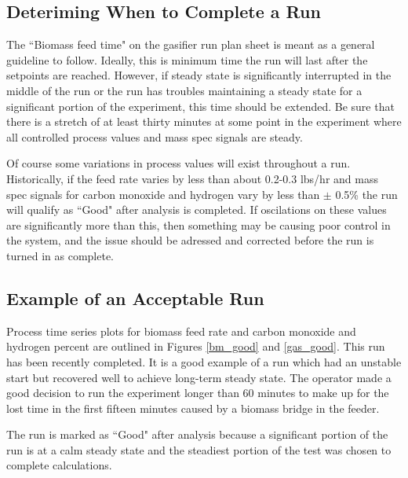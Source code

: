 \documentclass[11pt]{article}
\begin{document}
\subsection*{Deteriming When to Complete a Run}

The ``Biomass feed time" on the gasifier run plan sheet is meant as a general guideline to follow.  Ideally, this is minimum time the run will last after the setpoints are reached.  However, if steady state is significantly interrupted in the middle of the run or the run has troubles maintaining a steady state for a significant portion of the experiment, this time should be extended.  Be sure that there is a stretch of at least thirty minutes at some point in the experiment where all controlled process values and mass spec signals are steady.  

Of course some variations in process values will exist throughout a run.  Historically, if the feed rate varies by less than about 0.2-0.3 lbs/hr and mass spec signals for carbon monoxide and hydrogen vary by less than $\pm$ 0.5\% the run will qualify as ``Good" after analysis is completed.  If oscilations on these values are significantly more than this, then something may be causing poor control in the system, and the issue should be adressed and corrected before the run is turned in as complete.

\subsection*{Example of an Acceptable Run}

Process time series plots for biomass feed rate and carbon monoxide and hydrogen percent are outlined in Figures \ref{bm_good} and \ref{gas_good}.  This run has been recently completed.  It is a good example of a run which had an unstable start but recovered well to achieve long-term steady state.  The operator made a good decision to run the experiment longer than 60 minutes to make up for the lost time in the first fifteen minutes caused by a biomass bridge in the feeder.

The run is marked as ``Good" after analysis because a significant portion of the run is at a calm steady state and the steadiest portion of the test was chosen to complete calculations.
\end{document}
